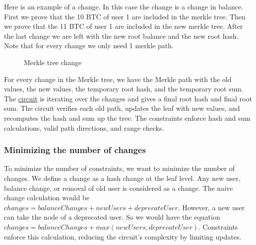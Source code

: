 Here is an example of a change. In this case the change is a change in balance. First we prove that the 10 BTC of user 1 are
included in the merkle tree. Then we prove that the 11 BTC of user 1 are included in the new merkle tree. After the last change we are left
with the new root balance and the new root hash. Note that for every change we only need 1 merkle path.

\begin{figure}
   \hfill
   \hfill
   \hfill
   \caption{Merkle tree change}
   \end{figure}

For every change in the Merkle tree, we have the Merkle path with the old values, the new values, the temporary root hash, and the temporary root sum.
The \hyperref[subsec:plcc]{circuit} is iterating over the changes and gives a final root hash and final root sum. 
The circuit verifies each old path, updates the leaf with new values, and recomputes the hash and sum up the tree. 
The constraints enforce hash and sum calculations, valid path directions, and range checks.

\subsubsection{Minimizing the number of changes}
To minimize the number of constraints, we want to minimize the number of changes.
We define a change as a hash change at the leaf level. Any new user, balance change, or removal of old user is considered as a change.
The naive change calculation would be $changes = balanceChanges + newUsers + deprecateUser$.
However, a new user can take the node of a deprecated user. So we would have the equation $changes = balanceChanges + max(newUsers, deprecateUser)$. 
Constraints enforce this calculation, reducing the circuit's complexity by limiting updates.

